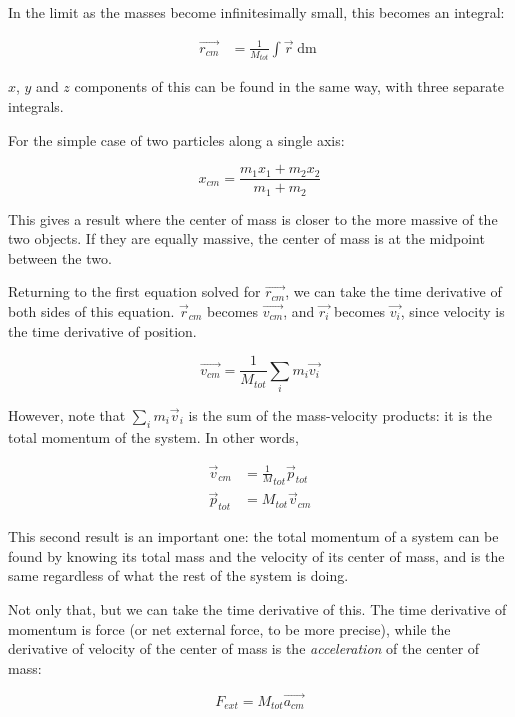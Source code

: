 In the limit as the masses become infinitesimally small, this becomes an integral:

\begin{align}
\vec{r_{cm}} &= \frac{1}{M_{tot}} \int \vec{r} \mathop{dm}
\end{align}

$x$, $y$ and $z$ components of this can be found in the same way, with three separate integrals.

For the simple case of two particles along a single axis:

\begin{equation}
x_{cm} = \frac{m_1 x_1 + m_2 x_2}{m_1 + m_2}
\end{equation}

This gives a result where the center of mass is closer to the more massive of the two objects. If they are equally massive, the center of mass is at the midpoint between the two.

Returning to the first equation solved for $\vec{r_{cm}}$, we can take the time derivative of both sides of this equation. $\vec{r}_{cm}$ becomes $\vec{v_{cm}}$, and $\vec{r_i}$ becomes $\vec{v_i}$, since velocity is the time derivative of position.

\begin{equation}
\vec{v_{cm}} = \frac{1}{M_{tot}} \sum_i m_i \vec{v_i}
\end{equation}

However, note that $\sum_i m_i \vec{v}_i$ is the sum of the mass-velocity products: it is the total momentum of the system. In other words,

\begin{align}
\vec{v}_{cm} &= \frac{1}{M}_{tot} \vec{p}_{tot}\\
\vec{p}_{tot} &= M_{tot} \vec{v}_{cm}
\end{align}

This second result is an important one: the total momentum of a system can be found by knowing its total mass and the velocity of its center of mass, and is the same regardless of what the rest of the system is doing.

Not only that, but we can take the time derivative of this. The time derivative of momentum is force (or net external force, to be more precise), while the derivative of velocity of the center of mass is the \emph{acceleration} of the center of mass:

\begin{equation}
F_{ext} = M_{tot} \vec{a_{cm}}
\end{equation}

